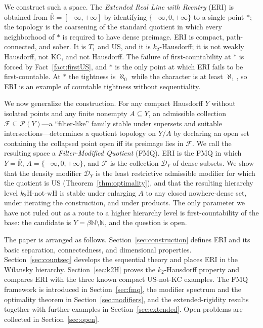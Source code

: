 \documentclass[11pt]{article}
\theoremstyle{definition}
\theoremstyle{remark}
\begin{document}
We construct such a space.
The \emph{Extended Real Line with Reentry} (ERI) is obtained from
$\overline{\mathbb{R}} = [-\infty, +\infty]$ by identifying
$\{-\infty, 0, +\infty\}$ to a single point $\ast$; the topology is
the coarsening of the standard quotient in which every neighborhood
of $\ast$ is required to have dense preimage.
ERI is compact, path-connected, and sober.
It is $T_1$ and US, and it is $k_2$-Hausdorff; it is not weakly
Hausdorff, not KC, and not Hausdorff.
The failure of first-countability at $\ast$ is forced by
Fact~\ref{fact:firstUS}, and $\ast$ is the only point at which ERI
fails to be first-countable.
At $\ast$ the tightness is $\aleph_0$ while the character is at least
$\aleph_1$, so ERI is an example of countable tightness without
sequentiality.

We now generalize the construction.
For any compact Hausdorff $Y$ without isolated points and any finite
nonempty $A \subseteq Y$, an admissible collection
$\mathcal{F} \subseteq \mathcal{P}(Y)$---a ``filter-like'' family
stable under supersets and suitable intersections---determines a
quotient topology on $Y/A$ by declaring an open set containing the
collapsed point open iff its preimage lies in $\mathcal{F}$.
We call the resulting space a \emph{Filter-Modified Quotient} (FMQ).
ERI is the FMQ in which $Y = \overline{\mathbb{R}}$, $A = \{-\infty,
0, +\infty\}$, and $\mathcal{F}$ is the collection $\mathcal{D}_Y$ of
dense subsets.
We show that the density modifier $\mathcal{D}_Y$ is the least
restrictive admissible modifier for which the quotient is US
(Theorem~\ref{thm:optimality}), and that the resulting hierarchy
level $k_2\mathrm{H}$-not-$\mathrm{wH}$ is stable under enlarging
$A$ to any closed nowhere-dense set, under iterating the
construction, and under products.
The only parameter we have not ruled out as a route to a higher
hierarchy level is first-countability of the base: the candidate is
$Y = \beta\mathbb{N} \setminus \mathbb{N}$, and the question is open.

The paper is arranged as follows.
Section~\ref{sec:construction} defines ERI and its basic separation,
connectedness, and dimensional properties.
Section~\ref{sec:countseq} develops the sequential theory and places
ERI in the Wilansky hierarchy.
Section~\ref{sec:k2H} proves the $k_2$-Hausdorff property and
compares ERI with the three known compact US-not-KC examples.
The FMQ framework is introduced in Section~\ref{sec:fmq}, the
modifier spectrum and the optimality theorem in
Section~\ref{sec:modifiers}, and the extended-rigidity results
together with further examples in Section~\ref{sec:extended}.
Open problems are collected in Section~\ref{sec:open}.
\end{document}
